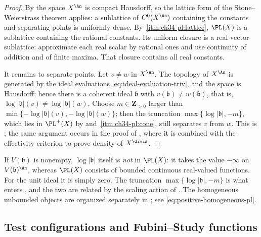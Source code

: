 \begin{proof}
By  the space $X^{\An}$ is compact
Hausdorff, so the lattice form of the Stone--Weierstrass theorem applies: a
sublattice of $C^0(X^{\An})$ containing the constants and separating
points is uniformly dense.  By
\,\cref{itm:ch34-pl:lattice}, $\PL(X)$ is a
sublattice containing the rational constants.  Its uniform closure
is a real vector sublattice: approximate each real scalar by rational
ones and use continuity of addition and of finite maxima.
That closure contains all real constants.

It remains to separate points.  Let $v\ne w$ in $X^{\An}$.  The topology
of $X^{\An}$ is generated by the ideal evaluations
\eqref{eq:ideal-evaluation-triv}, and the space is Hausdorff; hence there is
a coherent ideal $\mathfrak b$ with
$v(\mathfrak b)\ne w(\mathfrak b)$, that is,
$\log|\mathfrak b|(v)\ne\log|\mathfrak b|(w)$.  Choose
$m\in\mathbf Z_{>0}$ larger than $\min\{-\log|\mathfrak b|(v),
-\log|\mathfrak b|(w)\}$; then the truncation
$\max\{\log|\mathfrak b|,-m\}$, which lies in $\PL^+(X)$ by
 and
\,\cref{itm:ch34-pl:cone}, still separates $v$
from $w$.  This is \cite[Theorem~2.2 and Lemma~2.3]{BJ22}; the same
argument occurs in the proof of , where it
is combined with the effectivity criterion to prove density of
$X^{\divis}$.
\end{proof}

\begin{remark}
\label{rem:ch34-truncation}
If $V(\mathfrak b)$ is nonempty, $\log|\mathfrak b|$ itself is
\emph{not} in $\PL(X)$: it takes the value $-\infty$ on
$V(\mathfrak b)^{\An}$, whereas $\PL(X)$ consists of bounded
continuous real-valued functions.  For the unit ideal it is simply zero.
The truncation $\max\{\log|\mathfrak b|,-m\}$ is what enters
, and the two are related by the scaling action
of .  The homogeneous unbounded objects are
organized separately in ; see
\eqref{eq:positive-homogeneous-pl}.
\end{remark}

\subsection{Test configurations and Fubini--Study functions}

